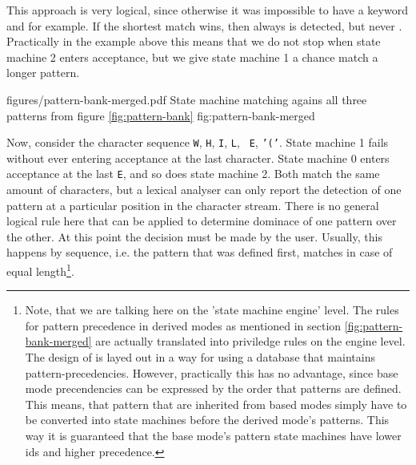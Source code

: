 
This approach is very logical, since otherwise it was impossible to have a
keyword  and  for example. If the shortest match
wins, then always  is detected, but never .
Practically in the example above this means that we do not stop when state
machine 2 enters acceptance, but we give state machine 1 a chance match a
longer pattern.

\showpic
{figures/pattern-bank-merged.pdf}
{State machine matching agains all three patterns from figure \ref{fig:pattern-bank} }
{fig:pattern-bank-merged}

Now, consider the character sequence {\tt W}, {\tt H}, {\tt I}, {\tt L}, {\tt
    E}, {\tt '('}.  State machine 1 fails without ever entering acceptance at
    the last character. State machine 0 enters acceptance at the last {\tt E},
    and so does state machine 2. Both match the same amount of characters, but
    a lexical analyser can only report the detection of one pattern at a
    particular position in the character stream. There is no general logical
    rule here that can be applied to determine dominace of one pattern over the
    other. At this point the decision must be made by the user. Usually, this
    happens by sequence, i.e. the pattern that was defined first, matches in
    case of equal length\footnote{Note, that we are talking here on the 'state
	machine engine' level. The rules for pattern precedence in derived
	    modes as mentioned in section \ref{fig:pattern-bank-merged} are actually translated into
	    priviledge rules on the engine level. The design of {\quex} 
	       is layed out in a way for using a database that maintains 
	    pattern-precedencies. However, practically this has no advantage, since
	   base mode precendencies can be expressed by the order that patterns are defined.
	   This means, that pattern that are inherited from based modes simply have to 
	  be converted into state machines before the derived mode's patterns. This way it is guaranteed
	 that the base mode's pattern state machines have lower ids and higher precedence.}.



